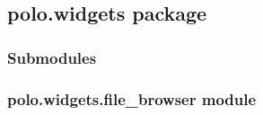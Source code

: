 \documentclass[letterpaper,10pt,english]{sphinxmanual}
\begin{document}
\subsection{polo.widgets package}
\label{\detokenize{polo.widgets:polo-widgets-package}}\label{\detokenize{polo.widgets::doc}}

\subsubsection{Submodules}
\label{\detokenize{polo.widgets:submodules}}

\subsubsection{polo.widgets.file\_browser module}
\label{\detokenize{polo.widgets:module-polo.widgets.file_browser}}\label{\detokenize{polo.widgets:polo-widgets-file-browser-module}}
\end{document}
